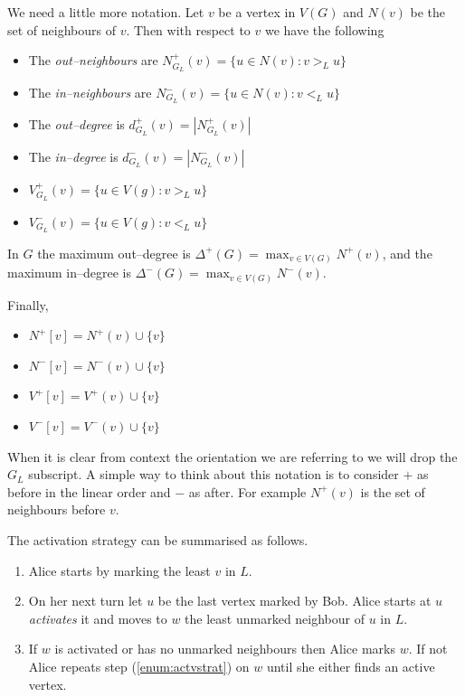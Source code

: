 We need a little more notation. Let $v$ be a vertex in $V(G)$ and $N(v)$ be the set of neighbours of $v$. Then with respect to $v$ we have the following
\begin{itemize}        
    \item The \textit{out--neighbours} are $N^+_{G_L}(v)=\{u\in N(v):v>_L u\}$ 
    \item The \textit{in--neighbours} are $N^-_{G_L}(v)=\{u\in N(v):v<_L u\}$ 
    \item The \textit{out--degree} is $d^+_{G_L}(v)=|N^+_{G_L}(v)|$ 
    \item The \textit{in--degree} is $d^-_{G_L}(v)=|N^-_{G_L}(v)|$
    \item $V^+_{G_L}(v)=\{u\in V(g):v>_L u\}$     
    \item $V^-_{G_L}(v)=\{u\in V(g):v<_L u\}$ 
\end{itemize}

In $G$ the maximum out--degree is $\Delta^+(G)=\max_{v\in V(G)}N^+(v)$, and 
the maximum in--degree is $\Delta^-(G)=\max_{v\in V(G)}N^-(v)$. 

Finally,
\begin{itemize}  
    \item $N^+[v]=N^+(v)\cup\{v\}$
    \item $N^-[v]=N^-(v)\cup\{v\}$
    \item $V^+[v]=V^+(v)\cup\{v\}$
    \item $V^-[v]=V^-(v)\cup\{v\}$
\end{itemize}
When it is clear from context the orientation we are referring to we will drop the $G_L$ subscript.  A simple way to think about this notation is to consider $+$ as before in the linear order and $-$ as after. For example $N^+(v)$ is the set of neighbours before $v$.

The activation strategy can be summarised as follows. 
\begin{enumerate}
    \item Alice starts by marking the least $v$ in $L$.
    \item On her next turn let $u$ be the last vertex marked by Bob. Alice starts at $u$ \textit{activates} it and moves to $w$ the least unmarked neighbour of $u$ in $L$. \label{enum:actvstrat}
    \item If $w$ is activated or has no unmarked neighbours then Alice marks $w$. If not Alice repeats step (\ref{enum:actvstrat}) on $w$ until she either finds an active vertex.
\end{enumerate}

